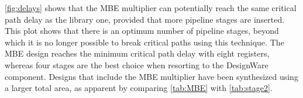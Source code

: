\autoref{fig:delays} shows that the MBE multiplier can potentially reach the same critical path delay as the library one, provided that more pipeline stages are inserted. This plot shows that there is an optimum number of pipeline stages, beyond which it is no longer possible to break critical paths using this technique. The MBE design reaches the minimum critical path delay with eight registers, whereas four stages are the best choice when resorting to the DesignWare component. Designs that include the MBE multiplier have been synthesized using a larger total area, as apparent by comparing \autoref{tab:MBE} with \autoref{tab:stage2}.
